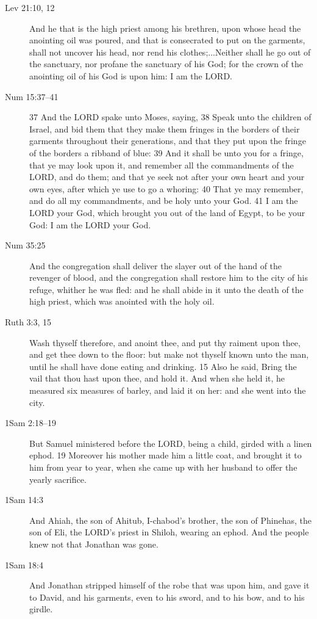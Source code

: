 \begin{description}
		\item[Lev 21:10, 12] And he that is the high priest among his brethren, upon whose head the anointing oil was poured, and that is consecrated to put on the garments, shall not uncover his head, nor rend his clothes;...Neither shall he go out of the sanctuary, nor profane the sanctuary of his God; for the crown of the anointing oil of his God is upon him: I am the LORD.
		\item[Num 15:37--41] 37 And the LORD spake unto Moses, saying, 38 Speak unto the children of Israel, and bid them that they make them fringes in the borders of their garments throughout their generations, and that they put upon the fringe of the borders a ribband of blue: 39 And it shall be unto you for a fringe, that ye may look upon it, and remember all the commandments of the LORD, and do them; and that ye seek not after your own heart and your own eyes, after which ye use to go a whoring: 40 That ye may remember, and do all my commandments, and be holy unto your God. 41 I am the LORD your God, which brought you out of the land of Egypt, to be your God: I am the LORD your God.
		\item[Num 35:25] And the congregation shall deliver the slayer out of the hand of the revenger of blood, and the congregation shall restore him to the city of his refuge, whither he was fled: and he shall abide in it unto the death of the high priest, which was anointed with the holy oil.
		\item[Ruth 3:3, 15] Wash thyself therefore, and anoint thee, and put thy raiment upon thee, and get thee down to the floor: but make not thyself known unto the man, until he shall have done eating and drinking. 15 Also he said, Bring the vail that thou hast upon thee, and hold it. And when she held it, he measured six measures of barley, and laid it on her: and she went into the city.
		\item[1Sam 2:18--19] But Samuel ministered before the LORD, being a child, girded with a linen ephod. 19 Moreover his mother made him a little coat, and brought it to him from year to year, when she came up with her husband to offer the yearly sacrifice.
		\item[1Sam 14:3] And Ahiah, the son of Ahitub, I-chabod's brother, the son of Phinehas, the son of Eli, the LORD's priest in Shiloh, wearing an ephod. And the people knew not that Jonathan was gone.
		\item[1Sam 18:4] And Jonathan stripped himself of the robe that was upon him, and gave it to David, and his garments, even to his sword, and to his bow, and to his girdle.

\end{description}
